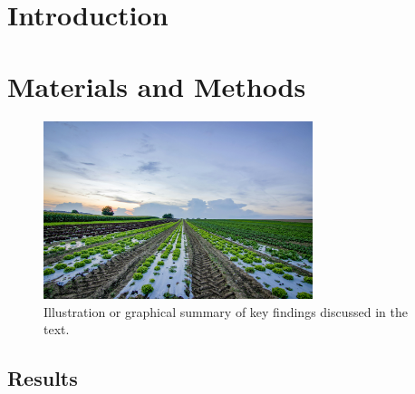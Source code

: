 \documentclass[11pt]{jabs}
\begin{document}
\clearpage

\pagestyle{mainstyle}
\setcounter{page}{1}
\switchcolumn

\begin{adjustwidth}{0.35\textwidth}{0pt} %

\section*{Introduction}
\lipsum[1-2]

\section*{Materials and Methods}
\lipsum[3-4]


\end{adjustwidth}

\vspace{1em}
\begin{figure}[H]
  \centering
  \includegraphics[width=0.7\textwidth]{images/materials-figure.png}
  \caption{Illustration or graphical summary of key findings discussed in the text.}
  \label{fig:materials and methods}
\end{figure}
\vspace{1em}

\begin{adjustwidth}{0.35\textwidth}{0pt}

\section*{Results}
\lipsum[5-6]


\end{adjustwidth}
\end{document}
